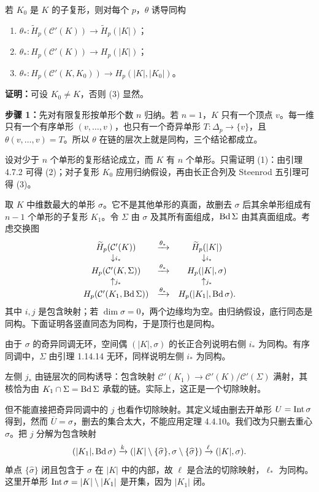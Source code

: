 若 $K_0$ 是 $K$ 的子复形，则对每个 $p$，$\theta$ 诱导同构
\begin{enumerate}[label=(\arabic*)]
\item $\theta_*:\widetilde H_p(\mathcal C'(K))\to\widetilde H_p(|K|)$；
\item $\theta_*:H_p(\mathcal C'(K))\to H_p(|K|)$；
\item $\theta_*:H_p(\mathcal C'(K,K_0))\to H_p(|K|,|K_0|)$。
\end{enumerate}

\textbf{证明：}可设 $K_0\ne K$，否则 (3) 显然。

\textbf{步骤 1：}先对有限复形按单形个数 $n$ 归纳。若 $n=1$，$K$ 只有一个顶点 $v$。每一维只有一个有序单形 $(v,\ldots,v)$，也只有一个奇异单形 $T:\Delta_p\to\{v\}$，且 $\theta(v,\ldots,v)=T$。所以 $\theta$ 在链的层次上就是同构，三个结论都成立。

设对少于 $n$ 个单形的复形结论成立，而 $K$ 有 $n$ 个单形。只需证明 (1)：由引理 4.7.2 可得 (2)；对子复形 $K_0$ 应用归纳假设，再由长正合列及 Steenrod 五引理可得 (3)。

取 $K$ 中维数最大的单形 $\sigma$。它不是其他单形的真面，故删去 $\sigma$ 后其余单形组成有 $n-1$ 个单形的子复形 $K_1$。令 $\Sigma$ 由 $\sigma$ 及其所有面组成，$\operatorname{Bd}\Sigma$ 由其真面组成。考虑交换图
\[
\begin{array}{ccc}
\widetilde H_p(\mathcal C'(K))&\xrightarrow{\theta_*}&\widetilde H_p(|K|)\\
\downarrow\scriptstyle i_*&&\downarrow\scriptstyle i_*\\
H_p(\mathcal C'(K,\Sigma))&\xrightarrow{\theta_*}&H_p(|K|,\sigma)\\
\uparrow\scriptstyle j_*&&\uparrow\scriptstyle j_*\\
H_p(\mathcal C'(K_1,\operatorname{Bd}\Sigma))&\xrightarrow{\theta_*}&H_p(|K_1|,\operatorname{Bd}\sigma).
\end{array}
\]
其中 $i,j$ 是包含映射；若 $\dim\sigma=0$，两个边缘均为空。由归纳假设，底行同态是同构。下面证明各竖直同态为同构，于是顶行也是同构。

由于 $\sigma$ 的奇异同调无环，空间偶 $(|K|,\sigma)$ 的长正合列说明右侧 $i_*$ 为同构。有序同调中，$\Sigma$ 由引理 1.14.14 无环，同样说明左侧 $i_*$ 为同构。

左侧 $j_*$ 由链层次的同构诱导：包含映射 $\mathcal C'(K_1)\to\mathcal C'(K)/\mathcal C'(\Sigma)$ 满射，其核恰为由 $K_1\cap\Sigma=\operatorname{Bd}\Sigma$ 承载的链。实际上，这正是一个切除映射。

但不能直接把奇异同调中的 $j$ 也看作切除映射。其定义域由删去开单形 $U=\operatorname{Int}\sigma$ 得到，然而 $\overline U=\sigma$，删去的集合太大，不能应用定理 4.4.10。我们改为只删去重心 $\widehat\sigma$。把 $j$ 分解为包含映射
\[
(|K_1|,\operatorname{Bd}\sigma)\xrightarrow{k}(|K|\setminus\{\widehat\sigma\},\sigma\setminus\{\widehat\sigma\})
\xrightarrow{\ell}(|K|,\sigma).
\]
单点 $\{\widehat\sigma\}$ 闭且包含于 $\sigma$ 在 $|K|$ 中的内部，故 $\ell$ 是合法的切除映射，$\ell_*$ 为同构。这里开单形 $\operatorname{Int}\sigma=|K|\setminus|K_1|$ 是开集，因为 $|K_1|$ 闭。

